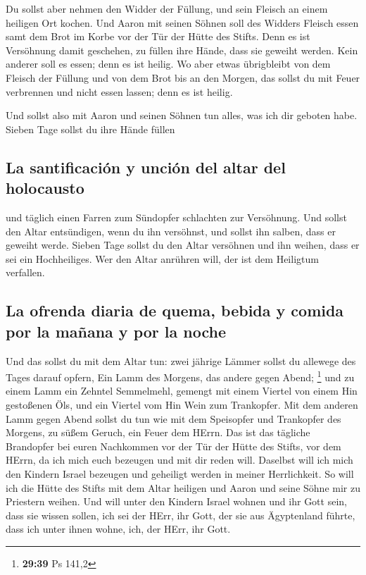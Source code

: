  Du sollst aber nehmen den Widder der Füllung, und sein
Fleisch an einem heiligen Ort kochen.  Und Aaron mit
seinen Söhnen soll des Widders Fleisch essen samt dem Brot im Korbe vor
der Tür der Hütte des Stifts.  Denn es ist Versöhnung
damit geschehen, zu füllen ihre Hände, dass sie geweiht werden. Kein
anderer soll es essen; denn es ist heilig.  Wo aber etwas
übrigbleibt von dem Fleisch der Füllung und von dem Brot bis an den
Morgen, das sollst du mit Feuer verbrennen und nicht essen lassen; denn
es ist heilig.

 Und sollst also mit Aaron und seinen Söhnen tun alles,
was ich dir geboten habe. Sieben Tage sollst du ihre Hände füllen

\hypertarget{la-santificaciuxf3n-y-unciuxf3n-del-altar-del-holocausto}{%
\subsection{La santificación y unción del altar del
holocausto}\label{la-santificaciuxf3n-y-unciuxf3n-del-altar-del-holocausto}}

 und täglich einen Farren zum Sündopfer schlachten zur
Versöhnung. Und sollst den Altar entsündigen, wenn du ihn versöhnst, und
sollst ihn salben, dass er geweiht werde.  Sieben Tage
sollst du den Altar versöhnen und ihn weihen, dass er sei ein
Hochheiliges. Wer den Altar anrühren will, der ist dem Heiligtum
verfallen.

\hypertarget{la-ofrenda-diaria-de-quema-bebida-y-comida-por-la-mauxf1ana-y-por-la-noche}{%
\subsection{La ofrenda diaria de quema, bebida y comida por la mañana y
por la
noche}\label{la-ofrenda-diaria-de-quema-bebida-y-comida-por-la-mauxf1ana-y-por-la-noche}}

 Und das sollst du mit dem Altar tun: zwei jährige Lämmer
sollst du allewege des Tages darauf opfern,  Ein Lamm des
Morgens, das andere gegen Abend; \footnote{\textbf{29:39} Ps 141,2}
 und zu einem Lamm ein Zehntel Semmelmehl, gemengt mit
einem Viertel von einem Hin gestoßenen Öls, und ein Viertel vom Hin Wein
zum Trankopfer.  Mit dem anderen Lamm gegen Abend sollst
du tun wie mit dem Speisopfer und Trankopfer des Morgens, zu süßem
Geruch, ein Feuer dem HErrn.  Das ist das tägliche
Brandopfer bei euren Nachkommen vor der Tür der Hütte des Stifts, vor
dem HErrn, da ich mich euch bezeugen und mit dir reden will.
 Daselbst will ich mich den Kindern Israel bezeugen und
geheiligt werden in meiner Herrlichkeit.  So will ich die
Hütte des Stifts mit dem Altar heiligen und Aaron und seine Söhne mir zu
Priestern weihen.  Und will unter den Kindern Israel
wohnen und ihr Gott sein,  dass sie wissen sollen, ich
sei der HErr, ihr Gott, der sie aus Ägyptenland führte, dass ich unter
ihnen wohne, ich, der HErr, ihr Gott.

